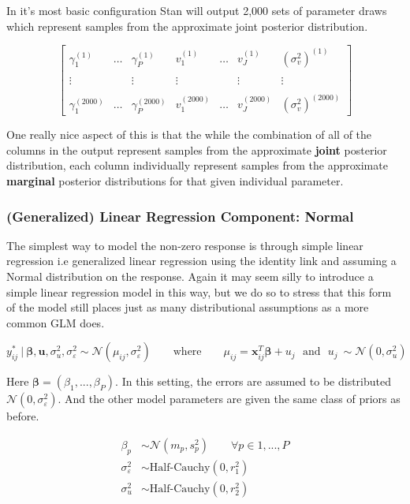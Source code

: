 \documentclass[12pt,twoside]{reedthesis}
\begin{document}
In it's most basic configuration Stan will output 2,000 sets of parameter draws which represent samples from the approximate joint posterior distribution.

\[
\begin{bmatrix}
  \gamma_1^{(1)} & \dots & \gamma_P^{(1)} & v_1^{(1)} & \dots & v_J^{(1)}  & (\sigma_{v}^2)^{(1)} \\
  \\ \vdots   &  & \vdots  & \vdots & &  \vdots & \vdots  \\ \\
  \gamma_1^{(2000)} & \dots &\gamma_P^{(2000)} & v_1^{(2000)}& \dots & v_J^{(2000)} & (\sigma_{v}^2)^{(2000)}
\end{bmatrix}
\]

One really nice aspect of this is that the while the combination of all of the columns in the output represent samples from the approximate \textbf{joint} posterior distribution, each column individually represent samples from the approximate \textbf{marginal} posterior distributions for that given individual parameter.

\hypertarget{bayeslin}{%
\subsubsection{(Generalized) Linear Regression Component: Normal}\label{bayeslin}}

The simplest way to model the non-zero response is through simple linear regression i.e generalized linear regression using the identity link and assuming a Normal distribution on the response. Again it may seem silly to introduce a simple linear regression model in this way, but we do so to stress that this form of the model still places just as many distributional assumptions as a more common GLM does.

\[
y^*_{ij} \ | \ \boldsymbol{\beta}, \boldsymbol{u}, \sigma_{u}^2,  \sigma_{\varepsilon}^2 \sim \mathcal{N}(\mu_{ij}, \sigma_{\varepsilon}^2) \qquad \text{where} \qquad \mu_{ij} = \mathbf{x}_{ij}^T\boldsymbol{\beta} + u_j \ \ \ \text{and} \ \ \ u_j \  \sim \mathcal{N}(0, \sigma_{u}^2)
\]

Here \(\boldsymbol{\beta} = (\beta_1, ..., \beta_P)\). In this setting, the errors are assumed to be distributed \(\mathcal{N}(0, \sigma_{\varepsilon}^2)\). And the other model parameters are given the same class of priors as before.

\[
\begin{aligned}
\beta_p &\sim \mathcal{N}(m_p, s_p^2)  \qquad \forall p\in 1, ..., P \\
\sigma_{\varepsilon}^2 &\sim \text{Half-Cauchy}(0, r_1^2) \\
\sigma_{u}^2 &\sim \text{Half-Cauchy}(0, r_2^2)
\end{aligned}
\]
\end{document}
